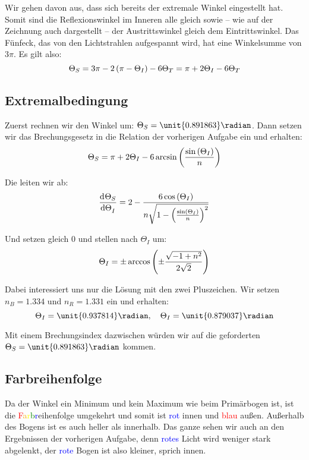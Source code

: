 \documentclass[11pt, ngerman, fleqn]{article}
\begin{document}
Wir gehen davon aus, dass sich bereits der extremale Winkel eingestellt hat.
Somit sind die Reflexionswinkel im Inneren alle gleich sowie -- wie auf der
Zeichnung auch dargestellt -- der Austrittswinkel gleich dem Eintrittswinkel.
Das Fünfeck, das von den Lichtstrahlen aufgespannt wird, hat eine Winkelsumme
von $3 \pi$. Es gilt also:
\[
	\Theta_S = 3 \pi - 2 \del{\pi - \Theta_I} - 6 \Theta_T
	= \pi + 2 \Theta_I - 6 \Theta_T
\]

\subsection{Extremalbedingung}

Zuerst rechnen wir den Winkel um: $\Theta_S = \unit{0.891863}\radian$. Dann setzen wir das Brechungsgesetz in die Relation der vorherigen Aufgabe ein und erhalten:
\[
	\Theta_S = \pi + 2 \Theta_I - 6 \arcsin\del{\frac{\sin\del{\Theta_I}} n}
\]

Die leiten wir ab:
\[
	\dod{\Theta_S}{\Theta_I} = 2 - \frac{6 \cos{\del{\Theta_I}}}{n \sqrt{1 - \del{\frac{\sin\del{\Theta_I}}n}^2}}
\]

Und setzen gleich 0 und stellen nach $\Theta_I$ um:
\[
	\Theta_I = \pm \arccos\del{\pm \frac{\sqrt{-1 + n^2}}{2 \sqrt{2}}}
\]

Dabei interessiert uns nur die Lösung mit den zwei Pluszeichen. Wir setzen $n_B = 1.334$ und $n_R = 1.331$ ein und erhalten:
\[
	\Theta_I = \unit{0.937814}\radian
	,\quad
	\Theta_I = \unit{0.879037}\radian
\]

Mit einem Brechungsindex dazwischen würden wir auf die geforderten $\Theta_S = \unit{0.891863}\radian$ kommen.

\subsection{Farbreihenfolge}

Da der Winkel ein Minimum und kein Maximum wie beim Primärbogen ist, ist die
\textcolor{red}F\textcolor{orange}a\textcolor{yellow}r\textcolor{green}b\textcolor{blue}reihenfolge
umgekehrt und somit ist \textcolor{blue}{rot} innen und \textcolor{red}{blau}
außen. Außerhalb des Bogens ist es auch heller als innerhalb. Das ganze sehen
wir auch an den Ergebnissen der vorherigen Aufgabe, denn
\textcolor{blue}{rotes} Licht wird weniger stark abgelenkt, der
\textcolor{blue}{rote} Bogen ist also kleiner, sprich innen.

\end{document}
